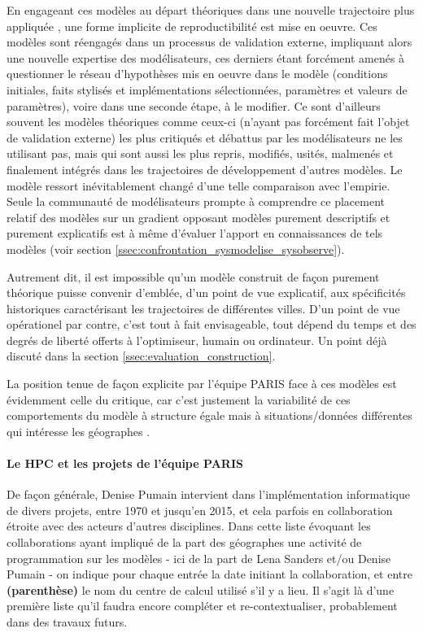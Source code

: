 En engageant ces modèles au départ théoriques dans une nouvelle trajectoire plus appliquée \autocite{Banos2013a}, une forme implicite de reproductibilité est mise en oeuvre. Ces modèles sont réengagés dans un processus de validation externe, impliquant alors une nouvelle expertise des modélisateurs, ces derniers étant forcément amenés à questionner le réseau d'hypothèses mis en oeuvre dans le modèle (conditions initiales, faits stylisés et implémentations sélectionnées, paramètres et valeurs de paramètres), voire dans une seconde étape, à le modifier. Ce sont d'ailleurs souvent les modèles théoriques comme ceux-ci (n'ayant pas forcément fait l'objet de validation externe) les plus critiqués et débattus par les modélisateurs ne les utilisant pas, mais qui sont aussi les plus repris, modifiés, usités, malmenés et finalement intégrés dans les trajectoires de développement d'autres modèles. Le modèle ressort inévitablement changé d'une telle comparaison avec l'empirie. Seule la communauté de modélisateurs prompte à comprendre ce placement relatif des modèles sur un gradient opposant modèles purement descriptifs et purement explicatifs est à même d'évaluer l'apport en connaissances de tels modèles \autocites{Bulle2005, Rouchier2013} (voir section \ref{ssec:confrontation_sysmodelise_sysobserve}).  %

Autrement dit, il est impossible qu'un modèle construit de façon purement théorique puisse convenir d'emblée, d'un point de vue explicatif, aux spécificités historiques caractérisant les trajectoires de différentes villes. D'un point de vue opérationel par contre, c'est tout à fait envisageable, tout dépend du temps et des degrés de liberté offerts à l'optimiseur, humain ou ordinateur. Un point déjà discuté dans la section \ref{ssec:evaluation_construction}.

La position tenue de façon explicite par l'équipe PARIS face à ces modèles est évidemment celle du critique, car c'est justement la variabilité de ces comportements du modèle à structure égale mais à situations/données différentes qui intéresse les géographes \autocite[99-103]{Pumain1989}.

\paragraph{Le HPC et les projets de l'équipe PARIS}

De façon générale, Denise Pumain intervient dans l’implémentation informatique de divers projets, entre 1970 et jusqu’en 2015, et cela parfois en collaboration étroite avec des acteurs d’autres disciplines. Dans cette liste évoquant les collaborations ayant impliqué de la part des géographes une activité de programmation sur les modèles - ici de la part de Lena Sanders et/ou Denise Pumain - on indique pour chaque entrée la date initiant la collaboration, et entre \textbf{(parenthèse)} le nom du centre de calcul utilisé s'il y a lieu. Il s'agit là d'une première liste qu'il faudra encore compléter et re-contextualiser, probablement dans des travaux futurs.

